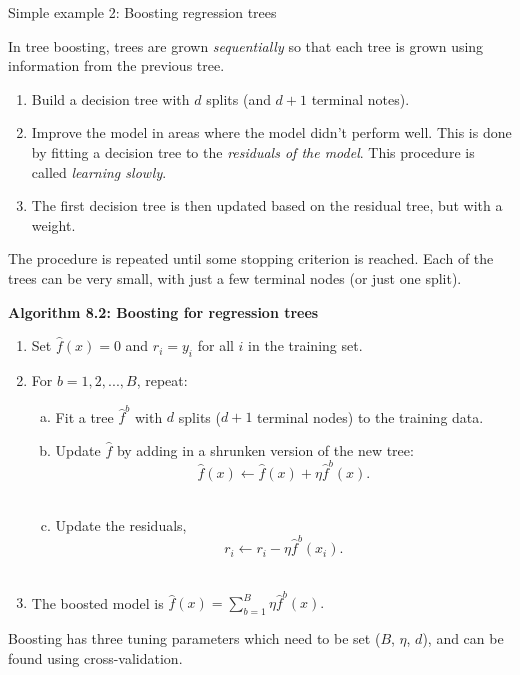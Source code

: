 \documentclass[
  10pt,
  ignorenonframetext,
]{beamer}
\providecommand{\tightlist}{%
  \setlength{\itemsep}{0pt}\setlength{\parskip}{0pt}}
\begin{document}
\begin{frame}{Simple example 2: Boosting regression trees}
\protect\hypertarget{simple-example-2-boosting-regression-trees}{}
\(~\)

In tree boosting, trees are grown \emph{sequentially} so that each tree
is grown using information from the previous tree.

\begin{enumerate}
\tightlist
\item
  Build a decision tree with \(d\) splits (and \(d+1\) terminal notes).
\item
  Improve the model in areas where the model didn't perform well. This
  is done by fitting a decision tree to the \emph{residuals of the
  model}. This procedure is called \emph{learning slowly}.
\item
  The first decision tree is then updated based on the residual tree,
  but with a weight.
\end{enumerate}

The procedure is repeated until some stopping criterion is reached. Each
of the trees can be very small, with just a few terminal nodes (or just
one split).
\end{frame}

\begin{frame}
\textbf{Algorithm 8.2: Boosting for regression trees}

\begin{enumerate}
\tightlist
\item
  Set \(\hat{f}(x) = 0\) and \(r_i = y_i\) for all \(i\) in the training
  set.
\item
  For \(b=1,2,...,B\), repeat:

  \begin{enumerate}
  [a)]
  \tightlist
  \item
    Fit a tree \(\hat{f}^b\) with \(d\) splits (\(d+1\) terminal nodes)
    to the training data.\\
  \item
    Update \(\hat{f}\) by adding in a shrunken version of the new tree:
    \[\hat{f}(x) \leftarrow \hat{f}(x)+\eta \hat{f}^b(x).\]\\
  \item
    Update the residuals,
    \[r_i \leftarrow r_i - \eta \hat{f}^b(x_i).\]\\
  \end{enumerate}
\item
  The boosted model is \(\hat{f}(x) = \sum_{b=1}^B \eta \hat{f}^b(x).\)
\end{enumerate}

Boosting has three tuning parameters which need to be set (\(B\),
\(\eta\), \(d\)), and can be found using cross-validation.
\end{frame}
\end{document}
